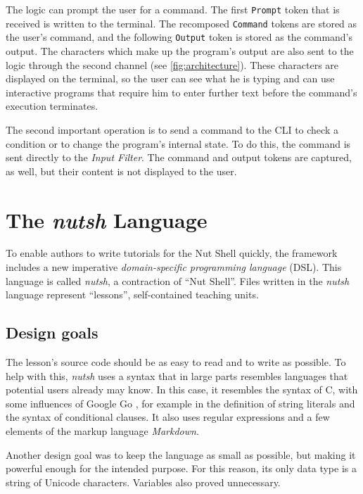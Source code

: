\documentclass[paper=a4,twoside,abstract=on,cleardoublepage=empty,numbers=noenddot,toc=bib,toc=listof,12pt,appendixprefix=true]{scrreprt}
\begin{document}
The logic can prompt the user for a command. The first \texttt{Prompt} token that is received is written to the terminal. The recomposed \texttt{Command} tokens are stored as the user's command, and the following \texttt{Output} token is stored as the command's output. The characters which make up the program's output are also sent to the logic through the second channel (see \cref{fig:architecture}). These characters are displayed on the terminal, so the user can see what he is typing and can use interactive programs that require him to enter further text before the command's execution terminates.

The second important operation is to send a command to the \textsc{CLI} to check a condition or to change the program's internal state. To do this, the command is sent directly to the \emph{Input Filter}. The command and output tokens are captured, as well, but their content is not displayed to the user.

\chapter{The \emph{nutsh} Language}
\label{sec:lang}

To enable authors to write tutorials for the Nut Shell quickly, the framework includes a new imperative \emph{domain-specific programming language} (\textsc{DSL}). This language is called \emph{nutsh}, a contraction of “Nut Shell”. Files written in the \emph{nutsh} language represent “lessons”, self-contained teaching units.

\section{Design goals}

The lesson's source code should be as easy to read and to write as possible. To help with this, \emph{nutsh} uses a syntax that in large parts resembles languages that potential users already may know. In this case, it resembles the syntax of C, with some influences of Google Go \cite{google13}, for example in the definition of string literals and the syntax of conditional clauses. It also uses regular expressions and a few elements of the markup language \emph{Markdown}.

Another design goal was to keep the language as small as possible, but making it powerful enough for the intended purpose. For this reason, its only data type is a string of Unicode characters. Variables also proved unnecessary.
\end{document}
